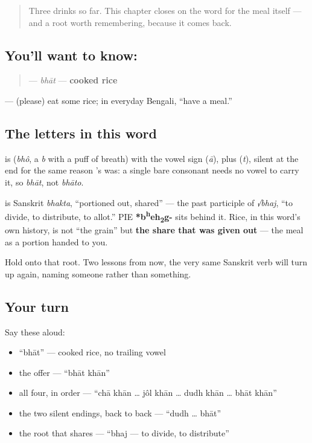 \label{lesson:BN-C10-bhat}



\begin{quote}
Three drinks so far. This chapter closes on the word for the meal itself — and a root worth remembering, because it comes back.
\end{quote}

\subsection*{You'll want to know: }
\begin{quote}
\textbf{} — \emph{bhāt} — \textbf{cooked rice}
\end{quote}

\textbf{ } — (please) eat some rice; in everyday Bengali, \textquotedblleft{}have a meal.\textquotedblright{}

\subsection*{The letters in this word}
\textbf{} is \textbf{} (\emph{bhô}, a \emph{b} with a puff of breath) with the vowel sign \textbf{} (\emph{ā}), plus \textbf{} (\emph{t}), silent at the end for the same reason 's  was: a single bare consonant needs no vowel to carry it, so \emph{bhāt}, not \emph{bhāto}.

\begin{cousinweb}
\textbf{} is Sanskrit \emph{bhakta}, \textquotedblleft{}portioned out, shared\textquotedblright{} — the past participle of \emph{√bhaj}, \textquotedblleft{}to divide, to distribute, to allot.\textquotedblright{} PIE \textbf{*b\textsuperscript{h}eh\textsubscript{2}g-} sits behind it. Rice, in this word's own history, is not \textquotedblleft{}the grain\textquotedblright{} but \textbf{the share that was given out} — the meal as a portion handed to you.

Hold onto that root. Two lessons from now, the very same Sanskrit verb will turn up again, naming someone rather than something.
\end{cousinweb}

\subsection*{Your turn}
Say these aloud:

\begin{itemize}
\raggedright
  \item \textquotedblleft{}bhāt\textquotedblright{} — cooked rice, no trailing vowel
  \item the offer — \textquotedblleft{}bhāt khān\textquotedblright{}
  \item all four, in order — \textquotedblleft{}chā khān … jôl khān … dudh khān … bhāt khān\textquotedblright{}
  \item the two silent endings, back to back — \textquotedblleft{}dudh … bhāt\textquotedblright{}
  \item the root that shares — \textquotedblleft{}bhaj — to divide, to distribute\textquotedblright{}
\end{itemize}

